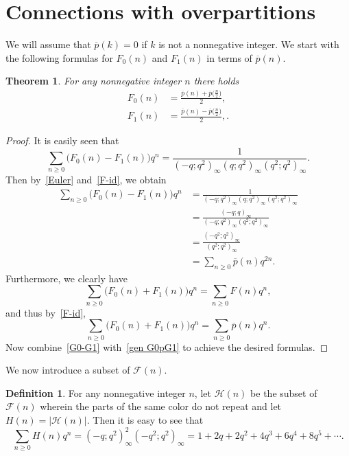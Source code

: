 \documentclass{amsart}
\numberwithin{equation}{section}
\newtheorem{theorem}{Theorem}
\theoremstyle{definition}
\newtheorem{definition}{Definition}
\newcommand{\fr}{\frac}
\begin{document}
\section{Connections with overpartitions}\label{sec overpartitions}
We will assume that $\overline{p}(k)=0$ if $k$ is not a nonnegative integer.
We start with the following formulas for $F_0(n)$ and $F_1(n)$ in terms of $\overline{p}(n)$.
\begin{theorem}\label{thm F01-id}
For any nonnegative integer $n$ there holds
\begin{align}
F_0(n) &= \fr{\overline{p}(n)+\overline{p}\big(\fr{n}{2}\big)}{2}, \label{F0-id} \\
F_1(n) &= \fr{\overline{p}(n)-\overline{p}\big(\fr{n}{2}\big)}{2}, \label{F1-id}.
\end{align}
\end{theorem}
%
\begin{proof}
It is easily seen that
\[
\sum_{n\geq 0} \big( F_0(n)-F_1(n) \big) q^n =\fr{1}{(-q;q^2)_\infty (q;q^2)_\infty (q^2;q^2)_\infty}.
\]
Then by~\eqref{Euler} and~\eqref{F-id}, we obtain
\begin{align}
\sum_{n\geq 0} \big( F_0(n)-F_1(n) \big) q^n &=\fr{1}{(-q;q^2)_\infty (q;q^2)_\infty (q^2;q^2)_\infty} \nonumber \\
&=\fr{(-q;q)_\infty}{(-q;q^2)_\infty (q^2;q^2)_\infty}  \nonumber\\
&=\fr{(-q^2;q^2)_\infty}{(q^2;q^2)_\infty} \nonumber \\
&=\sum_{n\geq 0} \overline{p}(n) q^{2n} . \label{G0-G1}
\end{align}
Furthermore, we clearly have
\[
\sum_{n\geq 0} \big( F_0(n)+F_1(n) \big) q^n = \sum_{n\geq 0} F(n) q^n,
\]
and thus by~\eqref{F-id},
\begin{equation}\label{gen G0pG1}
\sum_{n\geq 0} \big( F_0(n)+F_1(n) \big) q^n = \sum_{n\geq 0}\overline{p}(n) q^n.
\end{equation}
Now combine~\eqref{G0-G1} with~\eqref{gen G0pG1} to achieve the desired formulas.
\end{proof}
%
We now introduce a subset of $\mathcal{F}(n)$.
\begin{definition}\label{def H-set}
For any nonnegative integer $n$,
let $\mathcal{H}(n)$ be the subset of $\mathcal{F}(n)$ wherein the parts of the same color do not repeat and let $H(n)=|\mathcal{H}(n)|$.
Then it is easy to see that
\begin{equation}\label{gen H}
\sum_{n\geq 0} H(n) q^n = (-q;q^2)_\infty^2 (-q^2;q^2)_\infty = 1+2q+2q^2+4q^3+6q^4+8q^5+\cdots.
\end{equation}
\end{definition}
\end{document}
